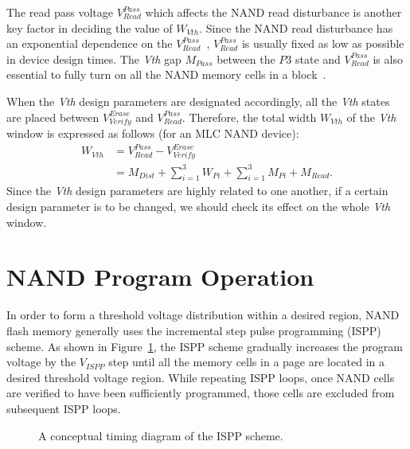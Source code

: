 The read pass voltage {\small $V^{Pass}_{Read}$} which affects the NAND read disturbance is another key factor in deciding the value of {\small $W_{Vth}$}.
Since the NAND read disturbance has an exponential dependence on the {\small$V^{Pass}_{Read}$}~\cite{ReadDisturb_Kang}, {\small $V^{Pass}_{Read}$} is usually fixed as low as possible in device design times.
The \textit{Vth} gap {\small $M_{Pass}$} between the $P3$ state and {\small$V^{Pass}_{Read}$} is also essential to fully turn on all the NAND memory cells in a block~\cite{Flash_Brewer}.


When the \textit{Vth} design parameters are designated accordingly, all the \textit{Vth} states are placed between {\small $V^{Erase}_{Verify}$} and {\small $V^{Pass}_{Read}$}.
Therefore, the total width {\small $W_{Vth}$} of the \textit{Vth} window is expressed as follows (for an MLC NAND device):
\begin{equation}\label{eq:Background_Wvth}
\begin{split}
W_{Vth} &= V^{Pass}_{Read} - V^{Erase}_{Verify} \\
        &= M_{Dist} + \sum_{i=1}^{3} W_{Pi} + \sum_{i=1}^{3} M_{Pi} + M_{Read} .
\end{split}
\end{equation}
Since the \textit{Vth} design parameters are highly related to one another, if a certain design parameter is to be changed, we should check its effect on the whole \textit{Vth} window.


\section{NAND Program Operation}
\label{sec:Background_NANDProgramOperation}

In order to form a threshold voltage distribution within a desired region, NAND flash memory generally uses the incremental step pulse programming (ISPP) scheme.
As shown in Figure~\ref{fig:Background_ISPP}, the ISPP scheme gradually increases the program voltage by the $V_{ISPP}$ step until all the memory cells in a page are located in a desired threshold voltage region.
While repeating ISPP loops, once NAND cells are verified to have been sufficiently programmed, those cells are excluded from subsequent ISPP loops.


\begin{figure}[!t]
\centering
\caption{A conceptual timing diagram of the ISPP scheme.}
\label{fig:Background_ISPP}
\end{figure}


